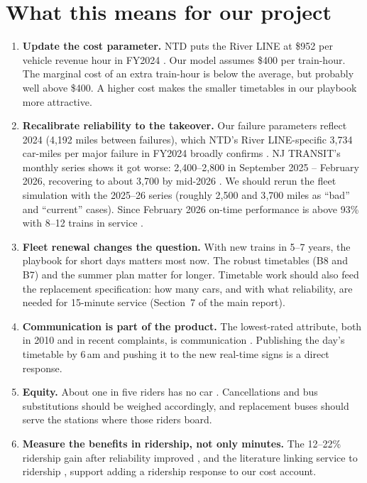 \documentclass[11pt]{article}
\begin{document}
\section{What this means for our project}\label{sec:implications}
\begin{enumerate}
\item \textbf{Update the cost parameter.} NTD puts the River LINE at \$952 per vehicle revenue hour in FY2024 \citep{ntd_metrics2224}. Our model assumes \$400 per train-hour. The marginal cost of an extra train-hour is below the average, but probably well above \$400. A higher cost makes the smaller timetables in our playbook more attractive.
\item \textbf{Recalibrate reliability to the takeover.} Our failure parameters reflect 2024 (4{,}192 miles between failures), which NTD's River LINE-specific 3{,}734 car-miles per major failure in FY2024 broadly confirms \citep{ntd_breakdowns2224}. NJ TRANSIT's monthly series shows it got worse: 2{,}400--2{,}800 in September 2025 -- February 2026, recovering to about 3{,}700 by mid-2026 \citep{njt_mdbf}. We should rerun the fleet simulation with the 2025--26 series (roughly 2{,}500 and 3{,}700 miles as ``bad'' and ``current'' cases). Since February 2026 on-time performance is above 93\% with 8--12 trains in service \citep{ols2027njt,ntd_monthly}.
\item \textbf{Fleet renewal changes the question.} With new trains in 5--7 years, the playbook for short days matters most now. The robust timetables (B8 and B7) and the summer plan matter for longer. Timetable work should also feed the replacement specification: how many cars, and with what reliability, are needed for 15-minute service (Section~7 of the main report).
\item \textbf{Communication is part of the product.} The lowest-rated attribute, both in 2010 and in recent complaints, is communication \citep{dvrpc2013,singleton2025}. Publishing the day's timetable by 6\,am and pushing it to the new real-time signs is a direct response.
\item \textbf{Equity.} About one in five riders has no car \citep{dvrpc2013}. Cancellations and bus substitutions should be weighed accordingly, and replacement buses should serve the stations where those riders board.
\item \textbf{Measure the benefits in ridership, not only minutes.} The 12--22\% ridership gain after reliability improved \citep{ntd_monthly}, and the literature linking service to ridership \citep{boisjoly2018,chakrabarti2015}, support adding a ridership response to our cost account.

\end{enumerate}
\end{document}
